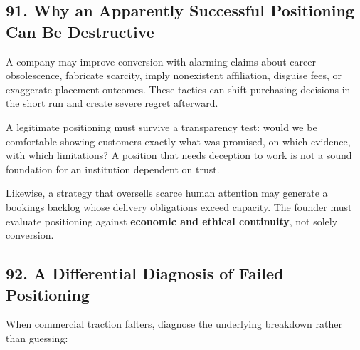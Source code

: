 \subsection*{91. Why an Apparently Successful Positioning Can Be Destructive}

A company may improve conversion with alarming claims about career obsolescence, fabricate scarcity, imply nonexistent affiliation, disguise fees, or exaggerate placement outcomes. These tactics can shift purchasing decisions in the short run and create severe regret afterward.

A legitimate positioning must survive a transparency test: would we be comfortable showing customers exactly what was promised, on which evidence, with which limitations? A position that needs deception to work is not a sound foundation for an institution dependent on trust.

Likewise, a strategy that oversells scarce human attention may generate a bookings backlog whose delivery obligations exceed capacity. The founder must evaluate positioning against \textbf{economic and ethical continuity}, not solely conversion.

\subsection*{92. A Differential Diagnosis of Failed Positioning}

When commercial traction falters, diagnose the underlying breakdown rather than guessing:


